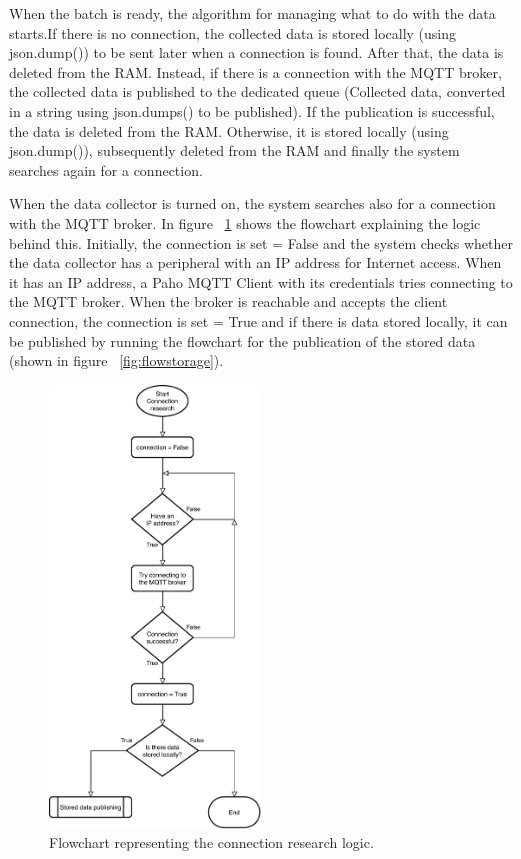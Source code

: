 When the batch is ready, the algorithm for managing what to do with the data starts.If there is no connection, the collected data is stored locally (using json.dump()) to be sent later when a connection is found. After that, the data is deleted from the RAM.
Instead, if there is a connection with the MQTT broker, the collected data is published to the dedicated queue (Collected data, converted in a string using json.dumps() to be published). If the publication is successful, the data is deleted from the RAM. Otherwise, it is stored locally (using json.dump()), subsequently deleted from the RAM and finally the system searches again for a connection.

When the data collector is turned on, the system searches also for a connection with the MQTT broker. In figure ~\ref{fig:flowconnection} shows the flowchart explaining the logic behind this. Initially, the connection is set = False and the system checks whether the data collector has a peripheral with an IP address for Internet access.
When it has an IP address, a Paho MQTT Client with its credentials tries connecting to the MQTT broker. When the broker is reachable and accepts the client connection, the connection is set = True and if there is data stored locally, it can be published by running the flowchart for the publication of the stored data (shown in figure ~\ref{fig:flowstorage}).

\begin{figure}[h]
\centering 
\includegraphics[width=0.5\textwidth]{images/flowconnection} 
\caption{Flowchart representing the connection research logic.}
\label{fig:flowconnection}
\end{figure}

